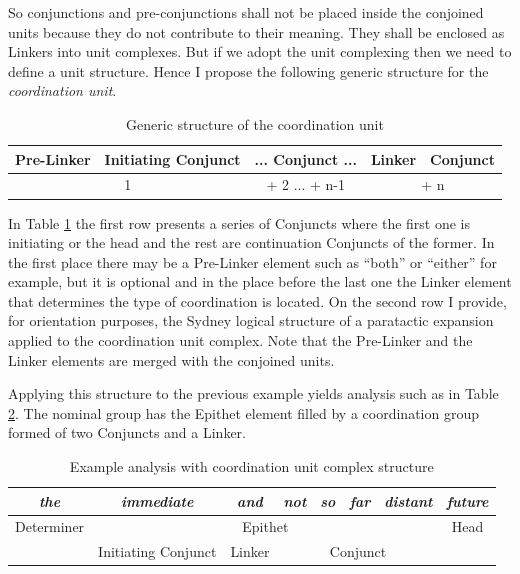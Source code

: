     So conjunctions and pre-conjunctions shall not be placed inside the conjoined units because they do not contribute to their meaning. They shall be enclosed as Linkers into unit complexes. But if we adopt the unit complexing then we need to define a unit structure. Hence I propose the following generic structure for the \textit{coordination unit}.
    
    \begin{table}[!h]
        \centering
        \begin{tabular}{|c|c|c|c|c|}
            \hline
            Pre-Linker & Initiating Conjunct & ... Conjunct ... & Linker & Conjunct \\ \hline
            \multicolumn{2}{|c|}{1} & + 2 ... + n-1 & \multicolumn{2}{c|}{+ n} \\ \hline
        \end{tabular}
        \caption{Generic structure of the coordination unit}
        \label{tab:coordination-complex}
    \end{table}
    
    In Table \ref{tab:coordination-complex} the first row presents a series of Conjuncts where the first one is initiating or the head and the rest are continuation Conjuncts of the former. In the first place there may be a Pre-Linker element such as ``both'' or ``either'' for example, but it is optional and in the place before the last one the Linker element that determines the type of coordination is located. On the second row I provide, for orientation purposes, the Sydney logical structure of a paratactic expansion applied to the coordination unit complex. Note that the Pre-Linker and the Linker elements are merged with the conjoined units.
    
    Applying this structure to the previous example yields analysis such as in Table \ref{tab:distant-future-compelx}. The nominal group has the Epithet element filled by a coordination group formed of two Conjuncts and a Linker.
    
    \begin{table}[!ht]
        \centering
        \begin{tabular}{c|c|c|c|c|c|c|c}
            \hline
            \multicolumn{1}{|c|}{\textit{the}} & \textit{immediate} & \textit{and} & \textit{not} & \textit{so} & \textit{far} & \textit{distant} & \multicolumn{1}{c|}{\textit{future}} \\ \hline
            \multicolumn{1}{|c|}{Determiner} & \multicolumn{6}{c|}{Epithet} & \multicolumn{1}{c|}{Head} \\ \hline
            & Initiating Conjunct & Linker & \multicolumn{4}{c|}{Conjunct} &  \\ \cline{2-7}
        \end{tabular}
        \caption{Example analysis with coordination unit complex structure}
        \label{tab:distant-future-compelx}
    \end{table}
    

